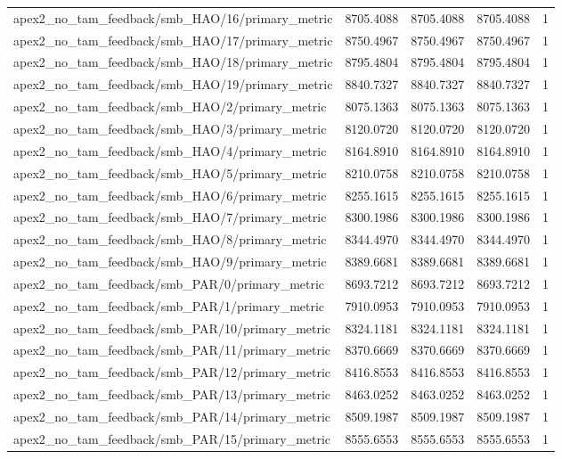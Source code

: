 \begin{table}[h]
\begin{tabular}{lrrrr}
apex2_no_tam_feedback/smb_HAO/16/primary_metric & 8705.4088 & 8705.4088 & 8705.4088 & 1 \\
apex2_no_tam_feedback/smb_HAO/17/primary_metric & 8750.4967 & 8750.4967 & 8750.4967 & 1 \\
apex2_no_tam_feedback/smb_HAO/18/primary_metric & 8795.4804 & 8795.4804 & 8795.4804 & 1 \\
apex2_no_tam_feedback/smb_HAO/19/primary_metric & 8840.7327 & 8840.7327 & 8840.7327 & 1 \\
apex2_no_tam_feedback/smb_HAO/2/primary_metric & 8075.1363 & 8075.1363 & 8075.1363 & 1 \\
apex2_no_tam_feedback/smb_HAO/3/primary_metric & 8120.0720 & 8120.0720 & 8120.0720 & 1 \\
apex2_no_tam_feedback/smb_HAO/4/primary_metric & 8164.8910 & 8164.8910 & 8164.8910 & 1 \\
apex2_no_tam_feedback/smb_HAO/5/primary_metric & 8210.0758 & 8210.0758 & 8210.0758 & 1 \\
apex2_no_tam_feedback/smb_HAO/6/primary_metric & 8255.1615 & 8255.1615 & 8255.1615 & 1 \\
apex2_no_tam_feedback/smb_HAO/7/primary_metric & 8300.1986 & 8300.1986 & 8300.1986 & 1 \\
apex2_no_tam_feedback/smb_HAO/8/primary_metric & 8344.4970 & 8344.4970 & 8344.4970 & 1 \\
apex2_no_tam_feedback/smb_HAO/9/primary_metric & 8389.6681 & 8389.6681 & 8389.6681 & 1 \\
apex2_no_tam_feedback/smb_PAR/0/primary_metric & 8693.7212 & 8693.7212 & 8693.7212 & 1 \\
apex2_no_tam_feedback/smb_PAR/1/primary_metric & 7910.0953 & 7910.0953 & 7910.0953 & 1 \\
apex2_no_tam_feedback/smb_PAR/10/primary_metric & 8324.1181 & 8324.1181 & 8324.1181 & 1 \\
apex2_no_tam_feedback/smb_PAR/11/primary_metric & 8370.6669 & 8370.6669 & 8370.6669 & 1 \\
apex2_no_tam_feedback/smb_PAR/12/primary_metric & 8416.8553 & 8416.8553 & 8416.8553 & 1 \\
apex2_no_tam_feedback/smb_PAR/13/primary_metric & 8463.0252 & 8463.0252 & 8463.0252 & 1 \\
apex2_no_tam_feedback/smb_PAR/14/primary_metric & 8509.1987 & 8509.1987 & 8509.1987 & 1 \\
apex2_no_tam_feedback/smb_PAR/15/primary_metric & 8555.6553 & 8555.6553 & 8555.6553 & 1 \\

\end{tabular}
\end{table}
